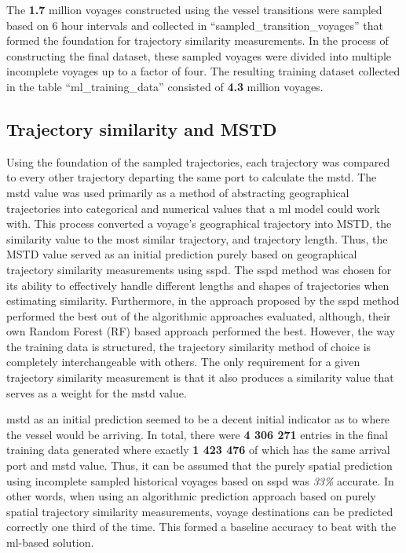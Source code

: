 The \textbf{1.7} million voyages constructed using the vessel transitions were sampled based on 6 hour intervals and collected in ``sampled\_transition\_voyages'' that formed the foundation for trajectory similarity measurements. In the process of constructing the final dataset, these sampled voyages were divided into multiple incomplete voyages up to a factor of four. The resulting training dataset collected in the table ``ml\_training\_data'' consisted of \textbf{4.3} million voyages.

\subsection{Trajectory similarity and MSTD}

Using the foundation of the sampled trajectories, each trajectory was compared to every other trajectory departing the same port to calculate the \acrfull{mstd}. The \acrshort{mstd} value was used primarily as a method of abstracting geographical trajectories into categorical and numerical values that a \acrfull{ml} model could work with. This process converted a voyage's geographical trajectory into MSTD, the similarity value to the most similar trajectory, and trajectory length. Thus, the MSTD value served as an initial prediction purely based on geographical trajectory similarity measurements using \acrfull{sspd}. The \acrshort{sspd} method was chosen for its ability to effectively handle different lengths and shapes of trajectories when estimating similarity. Furthermore, in the approach proposed by \cite{Zhang2020AISApproach} the \acrshort{sspd} method performed the best out of the algorithmic approaches evaluated, although, their own Random Forest (RF) based approach performed the best. However, the way the training data is structured, the trajectory similarity method of choice is completely interchangeable with others. The only requirement for a given trajectory similarity measurement is that it also produces a similarity value that serves as a weight for the \acrshort{mstd} value.

\acrshort{mstd} as an initial prediction seemed to be a decent initial indicator as to where the vessel would be arriving. In total, there were \textbf{4 306 271} entries in the final training data generated where exactly \textbf{1 423 476} of which has the same arrival port and \acrshort{mstd} value. Thus, it can be assumed that the purely spatial prediction using incomplete sampled historical voyages based on \acrshort{sspd} was \textit{33\%} accurate. In other words, when using an algorithmic prediction approach based on purely spatial trajectory similarity measurements, voyage destinations can be predicted correctly one third of the time. This formed a baseline accuracy to beat with the \acrshort{ml}-based solution.

